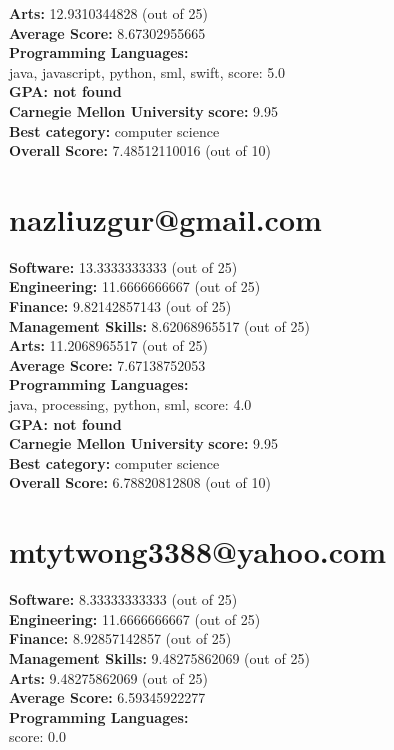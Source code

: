 \documentclass{article}
\begin{document}
\textbf{Arts:} 12.9310344828 (out of 25)\\
\textbf{Average Score: } 8.67302955665\\
\textbf{Programming Languages:} \\
java, javascript, python, sml, swift, score: 5.0\\
\textbf{GPA: not found}\\
\textbf{Carnegie Mellon University} \textbf{score:} 9.95\\
\textbf{Best category: } computer science\\
\textbf{Overall Score: }7.48512110016 (out of 10)\section{nazliuzgur@gmail.com}
\textbf{Software:} 13.3333333333 (out of 25)\\
\textbf{Engineering: } 11.6666666667 (out of 25)\\
\textbf{Finance:} 9.82142857143 (out of 25)\\
\textbf{Management Skills:} 8.62068965517 (out of 25)\\
\textbf{Arts:} 11.2068965517 (out of 25)\\
\textbf{Average Score: } 7.67138752053\\
\textbf{Programming Languages:} \\
java, processing, python, sml, score: 4.0\\
\textbf{GPA: not found}\\
\textbf{Carnegie Mellon University} \textbf{score:} 9.95\\
\textbf{Best category: } computer science\\
\textbf{Overall Score: }6.78820812808 (out of 10)\section{mtytwong3388@yahoo.com }
\textbf{Software:} 8.33333333333 (out of 25)\\
\textbf{Engineering: } 11.6666666667 (out of 25)\\
\textbf{Finance:} 8.92857142857 (out of 25)\\
\textbf{Management Skills:} 9.48275862069 (out of 25)\\
\textbf{Arts:} 9.48275862069 (out of 25)\\
\textbf{Average Score: } 6.59345922277\\
\textbf{Programming Languages:} \\
score: 0.0\\
\end{document}
